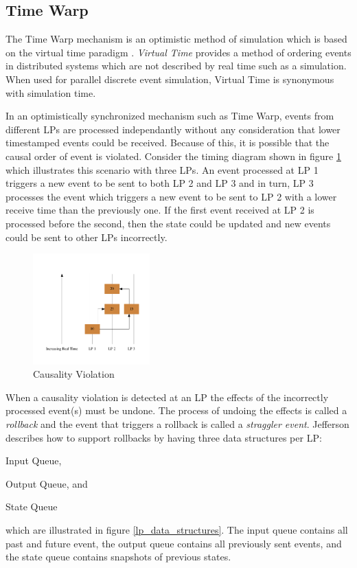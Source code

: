 \documentclass[11pt]{book}
\begin{document}
\subsection{Time Warp}

The Time Warp mechanism is an optimistic method of simulation which is based on the virtual
time paradigm \cite{jefferson-85}.  \emph{Virtual Time} provides a method of ordering events
in distributed systems which are not described by real time such as a simulation.  When used
for parallel discrete event simulation, Virtual Time is synonymous with simulation time.

In an optimistically synchronized mechanism such as Time Warp, events from different LPs are
processed independantly without any consideration that lower timestamped events could be
received. Because of this, it is possible that the causal order of event is violated. Consider
the timing diagram shown in figure \ref{causality_violation} which illustrates this scenario
with three LPs. An event processed at LP 1 triggers a new event to be sent to both LP 2 and
LP 3 and in turn, LP 3 processes the event which triggers a new event to be sent to LP 2 with
a lower receive time than the previously one. If the first event received at LP 2 is processed
before the second, then the state could be updated and new events could be sent to other LPs
incorrectly.

\begin{figure}
    \centering
    \includegraphics[width=0.4\textwidth,quiet]{figs/graphviz/causality.pdf}
    \caption{Causality Violation}\label{causality_violation}
\end{figure}

When a causality violation is detected at an LP the effects of the incorrectly processed event(s)
must be undone. The process of undoing the effects is called a \emph{rollback} and the event
that triggers a rollback is called a \emph{straggler event}. Jefferson\cite{jefferson-85}
describes how to support rollbacks by having three data structures per LP:
\begin{inparaenum}[(1)] \item Input Queue, \item Output Queue, and \item State Queue
\end{inparaenum} which are illustrated in figure \ref{lp_data_structures}. The input queue
contains all past and future event, the output queue contains all previously sent events, and
the state queue contains snapshots of previous states.
\end{document}
